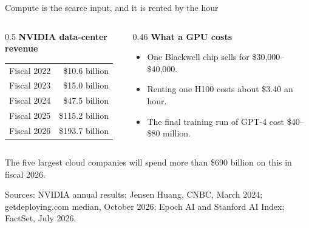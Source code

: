 \documentclass[aspectratio=169,11pt]{beamer}
\begin{document}
\begin{frame}{Compute is the scarce input, and it is rented by the hour}

\begin{columns}[T]
\begin{column}{0.5\textwidth}
\textbf{NVIDIA data-center revenue}

\vspace{0.1cm}
{\footnotesize
\begin{tabular}{@{}lr@{}}
\toprule
Fiscal 2022 & \$10.6 billion \\
Fiscal 2023 & \$15.0 billion \\
Fiscal 2024 & \$47.5 billion \\
Fiscal 2025 & \$115.2 billion \\
Fiscal 2026 & \$193.7 billion \\
\bottomrule
\end{tabular}}
\end{column}
\begin{column}{0.46\textwidth}
\textbf{What a GPU costs}
\begin{itemize}\setlength\itemsep{0.25em}
    \item One Blackwell chip sells for \$30,000--\$40,000.
    \item Renting one H100 costs about \$3.40 an hour.
    \item The final training run of GPT-4 cost \$40--\$80 million.
\end{itemize}
\end{column}
\end{columns}

\vspace{0.35cm}

\alert{The five largest cloud companies will spend more than \$690 billion on this in fiscal 2026.}

\vspace{0.1cm}
{\scriptsize\color{warmgray}Sources: NVIDIA annual results; Jensen Huang, CNBC, March 2024; getdeploying.com median, October 2026; Epoch AI and Stanford AI Index; FactSet, July 2026.}

\end{frame}
\end{document}
